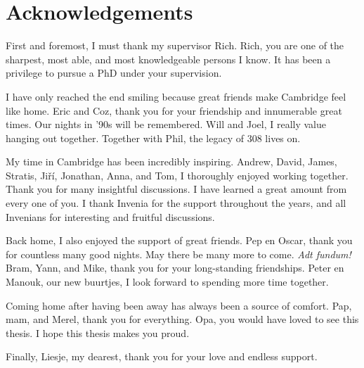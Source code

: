 \documentclass[12pt]{report}
\begin{document}
\chapter*{Acknowledgements}

First and foremost, I must thank my supervisor Rich.
Rich, you are one of the sharpest, most able, and most knowledgeable persons I know.
It has been a privilege to pursue a PhD under your supervision.

I have only reached the end smiling
because great friends make
Cambridge feel like home.
Eric and Coz, thank you for your friendship and
innumerable great times.
Our nights in '90s will be remembered.
Will and Joel, I really value hanging out together.
Together with Phil, the legacy of 308 lives on.

My time in Cambridge has been incredibly inspiring.
Andrew, David,
James, Stratis,
Ji\v{r}\'{i},
Jonathan,
Anna,
and Tom,
I thoroughly enjoyed working together.
Thank you for many insightful discussions.
I have learned a great amount from every one of you.
I thank Invenia for the support throughout the years,
and all Invenians for interesting and fruitful discussions.

Back home, I also enjoyed the support of great friends.
Pep en Oscar, thank you for countless many good nights.
May there be many more to come.
\textit{Adt fundum!}
Bram,
Yann, and Mike,
thank you for your long-standing friendships.
Peter en Manouk, our new buurtjes,
I look forward to spending more time together.

Coming home after having been away has always been a source of comfort.
Pap, mam, and Merel, thank you for everything.
Opa,
you would have loved to see this thesis.
I hope this thesis makes you proud.

Finally, Liesje, my dearest, thank you for your love and endless support.

\end{document}
